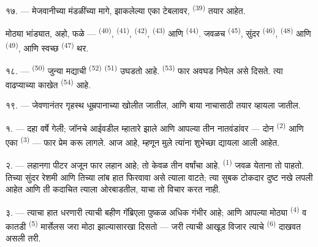 \VUsaut{2.4mm}
\VUsaut{3.0mm}

१७. --- मेजवानीच्या मंडळींच्या मागे,  झाकलेल्या एका टेबलावर,
 \textsuperscript{(39)} तयार आहेत.

मोठ्या भांड्यात, अहो, फळे ---  \textsuperscript{(40)},
 \textsuperscript{(41)},  \textsuperscript{(42)},
 \textsuperscript{(43)} आणि 
\textsuperscript{(44)}. जवळच  \textsuperscript{(45)}, सुंदर
 \textsuperscript{(46)}, 
\textsuperscript{(48)} आणि  \textsuperscript{(49)}, आणि स्वच्छ
 \textsuperscript{(47)} थर.

१८. ---  \textsuperscript{(50)} जुन्या मद्याची 
\textsuperscript{(52)}  \textsuperscript{(51)} उघडतो आहे.
 \textsuperscript{(53)} फार अवघड निघेल असे दिसते. त्या वाढप्याच्या
काखेत  \textsuperscript{(54)} आहे.

१९. --- जेवणानंतर गृहस्थ धूम्रपानाच्या खोलीत जातील, आणि बाया नाचासाठी तयार
व्हायला जातील.

\VUsaut{5.0mm}
\VUsaut{1.6mm}
\VUsaut{2.6mm}

\VUsaut{3.0mm}

१. --- दहा वर्षे गेली; जॉनचे आईवडील म्हातारे झाले आणि आपल्या तीन नातवंडांवर ---
दोन  \textsuperscript{(2)} आणि एका 
\textsuperscript{(3)} --- फार प्रेम करू लागले. आज  आहे,
म्हणून मुले त्यांना शुभेच्छा द्यायला आली आहेत.

२. --- लहानगा पीटर अजून फार लहान आहे; तो केवळ तीन वर्षांचा आहे. 
\textsuperscript{(1)} जवळ येताना तो पाहतो. तिच्या सुंदर रेशमी 
आणि तिच्या लांब  हात फिरवावा असे त्याला वाटते; त्या सुबक
 टोकदार दुष्ट नखे लपली आहेत आणि ती कदाचित त्याला ओरबाडतील, याचा
तो विचार करत नाही.

३. --- त्याचा हात धरणारी त्याची बहीण गॅब्रिएला पुष्कळ अधिक गंभीर आहे; आणि आपल्या
मोठ्या  \textsuperscript{(4)} व कातडी 
\textsuperscript{(5)} मार्सेलस जरा मोठा झाल्यासारखा दिसतो --- जरी त्याची आखूड
विजार त्याचे  \textsuperscript{(6)} दाखवत असली तरी.

